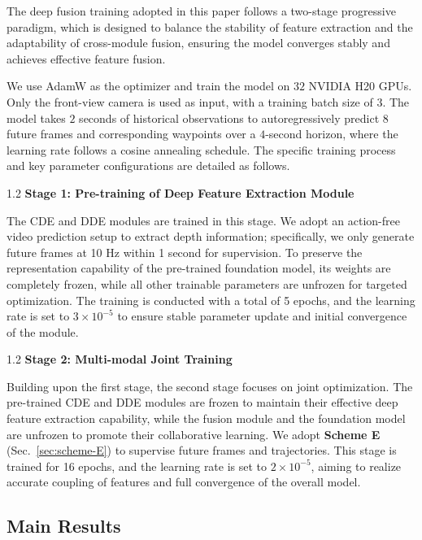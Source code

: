\documentclass[runningheads]{llncs}
\begin{document}
The deep fusion training adopted in this paper follows a two-stage progressive paradigm, which is designed to balance the stability of feature extraction and the adaptability of cross-module fusion, ensuring the model converges stably and achieves effective feature fusion. 

We use AdamW as the optimizer and train the model on $32$ NVIDIA H20 GPUs. 
Only the front-view camera is used as input, with a training batch size of $3$. 
The model takes $2$ seconds of historical observations to autoregressively predict 
$8$ future frames and corresponding waypoints over a $4$-second horizon, where the learning rate follows a cosine annealing schedule.
The specific training process and key parameter configurations are detailed as follows.

\begin{spacing}{1.2}
\textbf{Stage 1: Pre-training of Deep Feature Extraction Module}
\end{spacing}

The CDE and DDE modules are trained in this stage. We adopt an action-free video prediction setup to extract depth information; specifically, we only generate future frames at 10 Hz within 1 second for supervision. To preserve the representation capability of the pre-trained foundation model, its weights are completely frozen, while all other trainable parameters are unfrozen for targeted optimization. The training is conducted with a total of 5 epochs, and the learning rate is set to \(3 \times 10^{-5}\) to ensure stable parameter update and initial convergence of the module.

\begin{spacing}{1.2}
\textbf{Stage 2: Multi-modal Joint Training} 
\end{spacing}

Building upon the first stage, the second stage focuses on joint optimization. The pre-trained CDE and DDE modules are frozen to maintain their effective deep feature extraction capability, while the fusion module and the foundation model are unfrozen to promote their collaborative learning. We adopt \textbf{Scheme E} (Sec.~\ref{sec:scheme-E}) to supervise future frames and trajectories. This stage is trained for 16 epochs, and the learning rate is set to \(2 \times 10^{-5}\), aiming to realize accurate coupling of features and full convergence of the overall model.

\subsection{Main Results}
\end{document}
